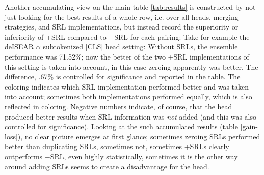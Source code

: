 
Another accumulating view on the main table \ref{tab:results} is constructed by not just
looking for the best results of a whole row, i.e. over all heads, merging strategies,
and SRL implementations, but instead record the superiority or inferiority of +SRL
compared to $-$SRL for each pairing: Take for example the deISEAR $\alpha$ subtokenized
[CLS] head setting: Without SRLs, the ensemble performance was 71.52\%; now the better
of the two +SRL implementations of this setting is taken into account, in this case
zeroing apparently was better. The difference, .67\% is controlled for significance and
reported in the table. The coloring indicates which SRL implementation performed better
and was taken into account; sometimes both implementations performed equally, which is
also reflected in coloring. Negative numbers indicate, of course, that the head produced
better results when SRL information was \emph{not} added (and this was also controlled
for significance).
Looking at the such accumulated results (table \ref{gain-loss}), no clear picture emerges
at first glance; sometimes zeroing SRLs performed better than duplicating SRLs, sometimes not,
sometimes +SRLs clearly outperforms $-$SRL, even highly statistically, sometimes it is
the other way around adding SRLs seems to create a disadvantage for the head.

